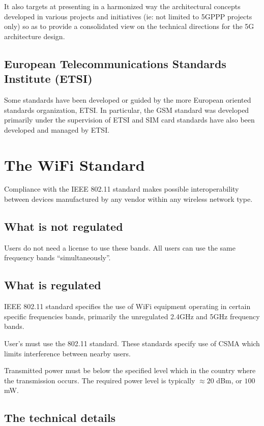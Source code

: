 It also targets at presenting in a harmonized way the architectural
concepts developed in various projects and initiatives (ie: not limited
to 5GPPP projects only) so as to provide a consolidated view on the
technical directions for the 5G architecture design.

\subsection{European Telecommunications Standards Institute (ETSI)}
\label{ETSI}

Some standards have been developed or guided by the more European
oriented standards organization, ETSI. In particular, the GSM \cite{GSM}
standard was developed primarily under the supervision of ETSI and
SIM card standards have also been developed and managed by ETSI.

\section{The WiFi Standard}

Compliance with the IEEE 802.11 standard \cite{ieee802_11standard}
makes possible interoperability between devices manufactured by any
vendor within any wireless network type.

\subsection{What is not regulated}
Users do not need a license to use these bands.
All users can use the same frequency bands ``simultaneously''.

\subsection{What is regulated}
IEEE 802.11 standard specifies the use of WiFi equipment operating
in certain specific frequencies bands, primarily the unregulated 2.4GHz and
5GHz frequency bands.  

User's must use the 802.11 standard.  These standards specify use of CSMA which
limits interference between nearby users.

Transmitted power must be below the specified level
which in the country where the transmission occurs.
The required power level is typically $\approx 20$ dBm, or $100$ mW.

\subsection{The technical details}

